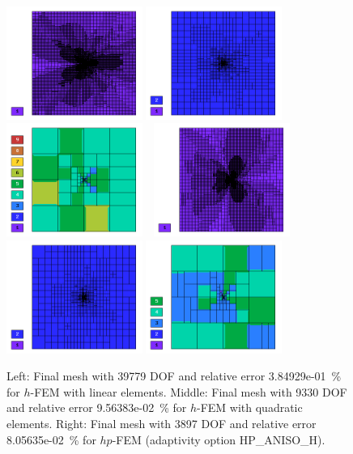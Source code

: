 \documentclass[12pt]{elsarticle}
\begin{document}
\begin{figure}[!ht]
\centering
\includegraphics[height=3.7cm]{nist/nist-3/mesh_u_h1_aniso.png}
\includegraphics[height=3.7cm]{nist/nist-3/mesh_u_h2_aniso.png}
\includegraphics[height=3.7cm]{nist/nist-3/mesh_u_hp_anisoh.png}\ \
\includegraphics[height=3.7cm]{nist/nist-3/mesh_v_h1_aniso.png}
\includegraphics[height=3.7cm]{nist/nist-3/mesh_v_h2_aniso.png}
\includegraphics[height=3.7cm]{nist/nist-3/mesh_v_hp_anisoh.png}
\caption{
Left: Final mesh with 39779 DOF and relative error 3.84929e-01~\% for $h$-FEM with linear elements.
Middle: Final mesh with 9330 DOF and relative error 9.56383e-02~\% for $h$-FEM with quadratic elements. 
Right: Final mesh with 3897 DOF and relative error 8.05635e-02~\% for $hp$-FEM (adaptivity option HP\_ANISO\_H).}
\label{fig:nist-3-hp-aniso}
\end{figure}
\end{document}
